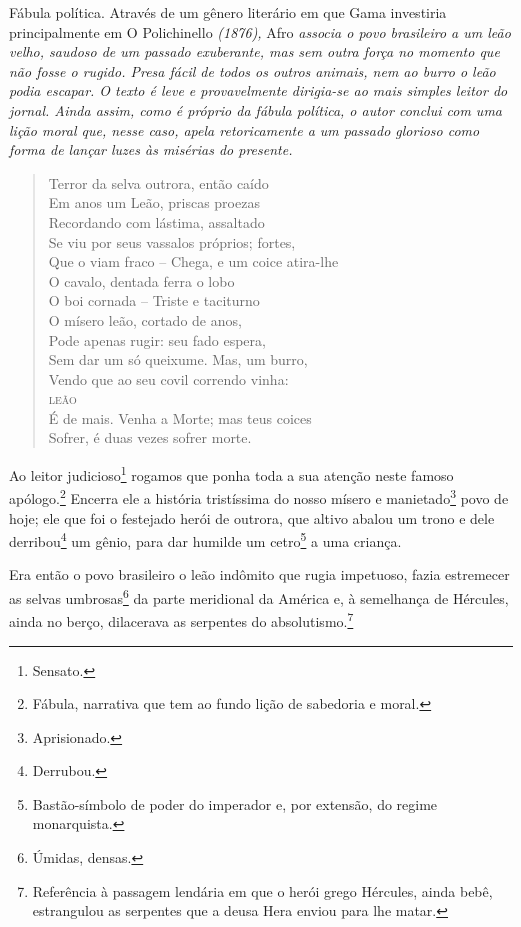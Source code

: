 \begin{didascalia}
Fábula política. Através de um gênero literário em que Gama investiria
principalmente em O Polichinello \emph{(1876),} Afro \emph{associa o
povo brasileiro a um leão velho, saudoso de um passado exuberante, mas
sem outra força no momento que não fosse o rugido. Presa fácil de todos
os outros animais, nem ao burro o leão podia escapar. O texto é leve e
provavelmente dirigia-se ao mais simples leitor do jornal. Ainda assim,
como é próprio da fábula política, o autor conclui com uma lição moral
que, nesse caso, apela retoricamente a um passado glorioso como forma de
lançar luzes às misérias do presente.}
\end{didascalia}


\begin{verse}
Terror da selva outrora, então caído\\
Em anos um Leão, priscas proezas\\
Recordando com lástima, assaltado\\
Se viu por seus vassalos próprios; fortes,\\
Que o viam fraco -- Chega, e um coice atira-lhe\\
O cavalo, dentada ferra o lobo\\
O boi cornada -- Triste e taciturno\\
O mísero leão, cortado de anos,\\
Pode apenas rugir: seu fado espera,\\
Sem dar um só queixume. Mas, um burro,\\
Vendo que ao seu covil correndo vinha:\\
\textsc{leão}\\
É de mais. Venha a Morte; mas teus coices\\
Sofrer, é duas vezes sofrer morte.
\end{verse}

\asterisc{}

Ao leitor judicioso\footnote{Sensato.} rogamos que ponha toda a sua
atenção neste famoso apólogo.\footnote{Fábula, narrativa que tem ao
  fundo lição de sabedoria e moral.} Encerra ele a história tristíssima
do nosso mísero e manietado\footnote{Aprisionado.} povo de hoje; ele
que foi o festejado herói de outrora, que altivo abalou um trono e dele
derribou\footnote{Derrubou.} um gênio, para dar humilde um
cetro\footnote{Bastão-símbolo de poder do imperador e, por extensão,
  do regime monarquista.} a uma criança.

Era então o povo brasileiro o leão indômito que rugia impetuoso, fazia
estremecer as selvas umbrosas\footnote{Úmidas, densas.} da parte
meridional da América e, à semelhança de Hércules, ainda no berço,
dilacerava as serpentes do absolutismo.\footnote{Referência à passagem
  lendária em que o herói grego Hércules, ainda bebê, estrangulou as
  serpentes que a deusa Hera enviou para lhe matar.}

